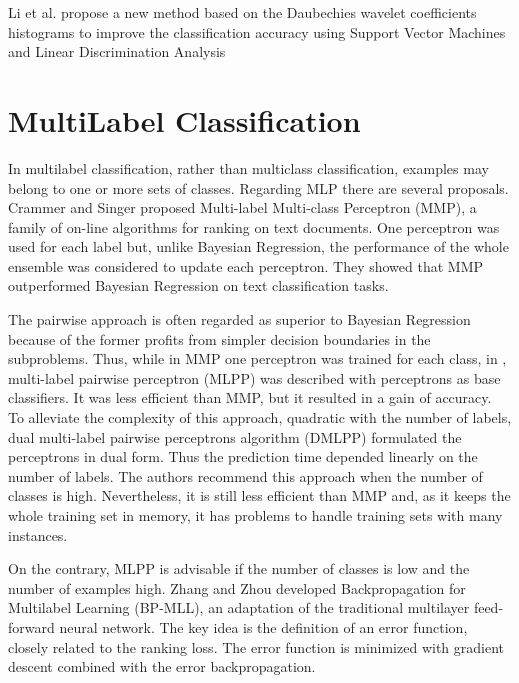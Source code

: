 Li et al. \cite{Li2003} propose a new method based on the Daubechies wavelet coefficients histograms
to improve the classification accuracy using Support Vector Machines and Linear Discrimination Analysis


\section{MultiLabel Classification}
\label{multilabelclassification}

In multilabel classification, rather than multiclass classification, 
examples may belong to one or more sets of classes. Regarding MLP there are several proposals.
Crammer and Singer \cite{Crammer2003} proposed Multi-label Multi-class Perceptron (MMP), a
family of on-line algorithms for ranking on text documents. 
One perceptron was used for each label but, unlike Bayesian Regression, the performance of the whole ensemble
was considered to update each perceptron. They showed that MMP outperformed
Bayesian Regression on text classification tasks.

The pairwise approach is often regarded as superior to Bayesian Regression because of the former profits from simpler decision boundaries in the subproblems. 
Thus, while in MMP one perceptron was trained for each class, in \cite{Mencia2009}, multi-label pairwise perceptron (MLPP) was described with perceptrons as base classifiers. 
It was less efficient than MMP, but it resulted in a gain of accuracy.
To alleviate the complexity of this approach, quadratic with the number of labels, dual multi-label pairwise perceptrons algorithm (DMLPP) \cite{LozaMencia2008} formulated the perceptrons in dual form. 
Thus the prediction time depended linearly on the number of labels. 
The authors recommend this approach when the number of classes is high. 
Nevertheless, it is still less efficient than MMP and, as it keeps the whole training set in memory, it has problems to
handle training sets with many instances. 


On the contrary, MLPP is advisable if the number of classes is low and the number of examples high. 
Zhang and Zhou \cite{Zhang2006} developed Backpropagation for Multilabel Learning (BP-MLL), an adaptation of
the traditional multilayer feed-forward neural network. The key idea is the definition of an error function, closely related to the ranking loss.
The error function is minimized with gradient descent combined with the error
backpropagation.

